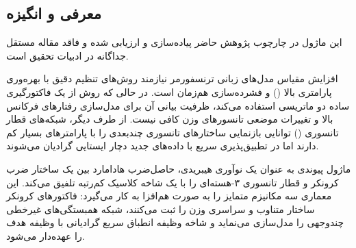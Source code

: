 \subsection{معرفی و انگیزه}
این ماژول در چارچوب پژوهش حاضر پیاده‌سازی و ارزیابی شده و فاقد مقاله مستقل جداگانه در ادبیات تحقیق است.

افزایش مقیاس مدل‌های زبانی ترنسفورمر نیازمند روش‌های تنظیم دقیق با بهره‌وری پارامتری بالا () و فشرده‌سازی هم‌زمان است. در حالی که روش  از یک فاکتورگیری ساده دو ماتریسی استفاده می‌کند، ظرفیت بیانی آن برای مدل‌سازی رفتارهای فرکانس بالا و تغییرات موضعی تانسورهای وزن کافی نیست. از طرف دیگر، شبکه‌های قطار تانسوری () توانایی بازنمایی ساختارهای تانسوری چندبعدی را با پارامترهای بسیار کم دارند اما در تطبیق‌پذیری سریع با داده‌های جدید دچار ایستایی گرادیان می‌شوند.

ماژول پیوندی  به عنوان یک نوآوری هیبریدی، حاصل‌ضرب هادامارد بین یک ساختار ضرب کرونکر و قطار تانسوری ۳-هسته‌ای را با یک شاخه کلاسیک کم‌رتبه  تلفیق می‌کند. این معماری سه مکانیزم متمایز را به صورت هم‌افزا به کار می‌گیرد: فاکتورهای کرونکر ساختار متناوب و سراسری وزن را ثبت می‌کنند، شبکه  همبستگی‌های غیرخطی چندوجهی را مدل‌سازی می‌نماید و شاخه  وظیفه انطباق سریع گرادیانی با وظیفه هدف را عهده‌دار می‌شود.
